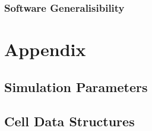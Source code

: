 \documentclass{UoYCSproject}
\begin{document}
\subsection{Software Generalisibility}%



\printbibliography

\chapter{Appendix}
\section{Simulation Parameters}


\section{Cell Data Structures}
 
\end{document}
